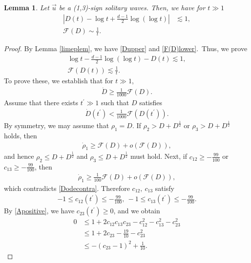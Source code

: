 \documentclass[reqno]{amsart}
\theoremstyle{plain}
\newtheorem{lemma}[theorem]{Lemma}
\theoremstyle{definition}
\numberwithin{equation}{section}
\newcommand{\1}{\mathbbm{1}}
\begin{document}
\begin{lemma}\label{Dlogtorder}
Let $\vec{u}$ be a (1,3)-sign solitary waves. Then, we have for $t\gg 1$
\begin{align}
\left|D(t)-\log{t}+\frac{d-1}{2}\log{(\log{t})}\right|&\lesssim 1, \label{Dsimes1}
\\
\mathcal{F}(D)\sim \frac{1}{t}. \label{mathcalFsimes1}
\end{align}
\end{lemma}
\begin{proof}
By Lemma \ref{limeplem}, we have \eqref{Dupper} and \eqref{F(D)lower}.\ Thus, we prove
\begin{align}
\log{t}-\frac{d-1}{2}\log{(\log{t})}-D(t)\lesssim 1, \label{Dlower}
\\
\mathcal{F}(D(t))\lesssim \frac{1}{t}. \label{F(D)upper}
\end{align}
To prove these, we establish that for $t\gg 1$,
\begin{align}\label{Dodees}
\dot{D}\geq \frac{1}{1000}\mathcal{F}(D).
\end{align}
Assume that there exists $t^{\prime}\gg 1$ such that $D$ satisfies
\begin{align}\label{Dodecontra}
\dot{D}(t^{\prime})< \frac{1}{1000}\mathcal{F}(D(t^{\prime})).
\end{align}
By symmetry, we may assume that $\rho_1=D$. If $\rho_2>D+D^{\frac{1}{2}}$ or $\rho_3>D+D^{\frac{1}{2}}$ holds, then
\begin{align*}
\dot{\rho}_1\geq \mathcal{F}(D)+o\left(\mathcal{F}(D)\right),
\end{align*}
and hence $\rho_2\leq D+D^{\frac{1}{2}}$ and $\rho_3\leq D+D^{\frac{1}{2}}$ must hold. Next, if $c_{12}\geq -\frac{99}{100}$ or $c_{13}\geq -\frac{99}{100}$, then
\begin{align*}
\dot{\rho}_1\geq \frac{1}{100}\mathcal{F}(D)+o\left(\mathcal{F}(D)\right),
\end{align*}
which contradicts \eqref{Dodecontra}. Therefore $c_{12},\ c_{13}$ satisfy
\begin{align*}
-1\leq c_{12}(t^{\prime})\leq -\frac{99}{100},\ -1\leq c_{13}(t^{\prime})\leq -\frac{99}{100}.
\end{align*}
By \eqref{Apositive}, we have $c_{23}(t^{\prime})\geq 0$, and we obtain
\begin{align*}
0&\leq 1+2c_{12}c_{13}c_{23}-c_{12}^2-c_{13}^2-c_{23}^2
\\
&\leq 1+2c_{23}-\frac{19}{10}-c_{23}^2
\\
&\leq -(c_{23}-1)^2+\frac{1}{10}.

\end{align*}
\end{proof}
\end{document}
